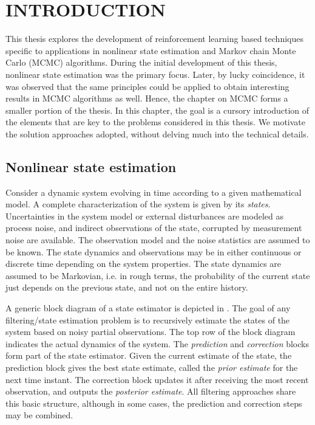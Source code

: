 \chapter{INTRODUCTION} 
\label{chap1_intro}

This thesis explores the development of reinforcement learning based techniques specific to applications in nonlinear state estimation and Markov chain Monte Carlo (MCMC) algorithms. During the initial development of this thesis, nonlinear state estimation was the primary focus. Later, by lucky coincidence, it was observed that the same principles could be applied to obtain interesting results in MCMC algorithms as well. Hence, the chapter on MCMC forms a smaller portion of the thesis. In this chapter, the goal is a cursory introduction of the elements that are key to the problems considered in this thesis. We motivate the solution approaches adopted, without delving much into the technical details. 

\section{Nonlinear state estimation}
Consider a dynamic system evolving in time according to a given mathematical model. A complete characterization of the system is given by its \textit{states}. Uncertainties in the system model or external disturbances are modeled as process noise, and indirect observations of the state, corrupted by measurement noise are available. The observation model and the noise statistics are assumed to be known. The state dynamics and observations may be in either continuous or discrete time depending on the system properties. The state dynamics are assumed to be Markovian, i.e. in rough terms, the probability of the current state just depends on the previous state, and not on the entire history. 

A generic block diagram of a state estimator is depicted in . The goal of any filtering/state estimation problem is to recursively estimate the states of the system based on noisy partial observations. The top row of the block diagram indicates the actual dynamics of the system. The \textit{prediction} and \textit{correction} blocks form part of the state estimator. Given the current estimate of the state, the prediction block gives the best state estimate, called the \textit{prior estimate} for the next time instant. The correction block updates it after receiving the most recent observation, and outputs the \textit{posterior estimate}. All filtering approaches share this basic structure, although in some cases, the prediction and correction steps may be combined.  

